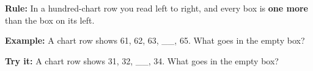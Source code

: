\documentclass[12pt]{article}
\begin{document}

\begin{formulabox}
\textbf{Rule:} In a hundred-chart row you read left to right, and every box is
\textbf{one more} than the box on its left.
\end{formulabox}

\begin{examplebox}
\textbf{Example:} \quad A chart row shows 61, 62, 63, \_\_, 65. What goes in
the empty box?
\end{examplebox}

\begin{tryitbox}
\textbf{Try it:} \quad A chart row shows 31, 32, \_\_, 34. What goes in the
empty box?\\[2pt]
\end{tryitbox}
\end{document}
